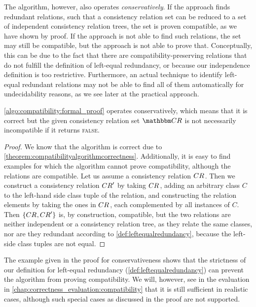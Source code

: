 The algorithm, however, also operates \emph{conservatively}.
If the approach finds redundant relations, such that a consistency relation set can be reduced to a set of independent consistency relation trees, the set is proven compatible, as we have shown by proof.
If the approach is not able to find such relations, the set may still be compatible, but the approach is not able to prove that.
Conceptually, this can be due to the fact that there are compatibility-preserving relations that do not fulfill the definition of left-equal redundancy, or because our independence definition is too restrictive.
Furthermore, an actual technique to identify left-equal redundant relations may not be able to find all of them automatically for undecidability reasons, as we see later at the practical approach.

\begin{theorem}
    \autoref{algo:compatibility:formal_proof} operates conservatively, which means that it is correct but the given consistency relation set $\consistencyrelationset{CR}$ is not necessarily incompatible if it returns \textsc{false}.
\end{theorem}

\begin{proof}
    We know that the algorithm is correct due to \autoref{theorem:compatibilityalgorithmcorrectness}.
    Additionally, it is easy to find examples for which the algorithm cannot prove compatibility, although the relations are compatible.
    Let us assume a consistency relation $\consistencyrelation{CR}{}$. 
    Then we construct a consistency relation $\consistencyrelation{CR}{}'$ by taking $\consistencyrelation{CR}{}$, adding an arbitrary class $C$ to the left-hand side class tuple of the relation, and constructing the relation elements by taking the ones in $\consistencyrelation{CR}{}$, each complemented by all instances of $C$.
    Then $\setted{\consistencyrelation{CR}{},\consistencyrelation{CR}{}'}$ is, by construction, compatible, but the two relations are neither independent or a consistency relation tree, as they relate the same classes, nor are they redundant according to \autoref{def:leftequalredundancy}, because the left-side class tuples are not equal.
\end{proof}

The example given in the proof for conservativeness shows that the strictness of our definition for left-equal redundancy (\autoref{def:leftequalredundancy}) can prevent the algorithm from proving compatibility.
We will, however, see in the evaluation in \autoref{chap:correctness_evaluation:compatibility} that it is still sufficient in realistic cases, although such special cases as discussed in the proof are not supported.

